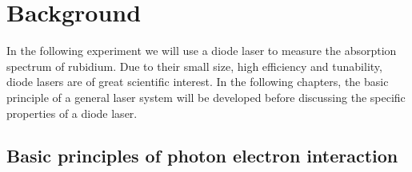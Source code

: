 \section{Background}

In the following experiment we will use a diode laser to measure the absorption
spectrum of rubidium. Due to their small size, high efficiency and tunability,
diode lasers are of great scientific interest.
In the following chapters, the basic principle
of a general laser system will be developed before discussing the specific
properties of a diode laser.

\subsection{Basic principles of photon electron interaction}

